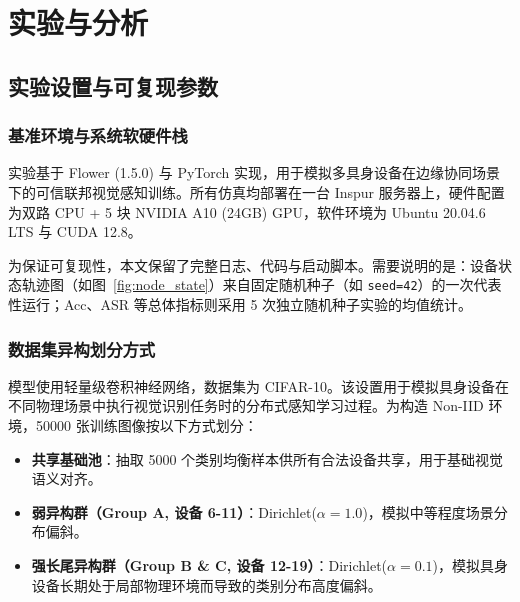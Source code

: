 \documentclass[11pt, a4paper, UTF8, fontset=fandol]{ctexart}
\begin{document}
\section{实验与分析}
\label{sec:experiments}
\subsection{实验设置与可复现参数}

\subsubsection{基准环境与系统软硬件栈}
实验基于 Flower (1.5.0) 与 PyTorch 实现，用于模拟多具身设备在边缘协同场景下的可信联邦视觉感知训练。所有仿真均部署在一台 Inspur 服务器上，硬件配置为双路 CPU + 5 块 NVIDIA A10 (24GB) GPU，软件环境为 Ubuntu 20.04.6 LTS 与 CUDA 12.8。

为保证可复现性，本文保留了完整日志、代码与启动脚本。需要说明的是：设备状态轨迹图（如图~\ref{fig:node_state}）来自固定随机种子（如 \texttt{seed=42}）的一次代表性运行；Acc、ASR 等总体指标则采用 5 次独立随机种子实验的均值统计。

\subsubsection{数据集异构划分方式}
模型使用轻量级卷积神经网络，数据集为 CIFAR-10。该设置用于模拟具身设备在不同物理场景中执行视觉识别任务时的分布式感知学习过程。为构造 Non-IID 环境，50000 张训练图像按以下方式划分：
\begin{itemize}
    \item \textbf{共享基础池}：抽取 5000 个类别均衡样本供所有合法设备共享，用于基础视觉语义对齐。
    \item \textbf{弱异构群（Group A, 设备 6-11）}：Dirichlet($\alpha=1.0$)，模拟中等程度场景分布偏斜。
    \item \textbf{强长尾异构群（Group B \& C, 设备 12-19）}：Dirichlet($\alpha=0.1$)，模拟具身设备长期处于局部物理环境而导致的类别分布高度偏斜。
\end{itemize}
\end{document}
